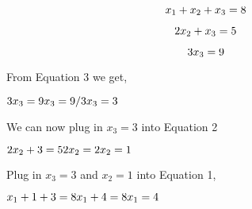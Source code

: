 \documentclass{article}
\begin{document}
    \setcounter{equation}{0} %
    
    \begin{equation} %
        \raggedright x_1 + x_2 + x_3 = 8 
    \end{equation}

    \begin{equation} %
        \raggedright 2x_2 + x_3 = 5 
    \end{equation}

    \begin{equation} %
        \raggedright 3x_3 = 9 
    \end{equation}

\raggedright From Equation 3 we get, \newline

    \begin{math}
         3x_3 = 9 
         \newline %
         x_3 = 9/3 
         \newline
         x_3 = 3
    \end{math} \newline

\raggedright We can now plug in  \begin{math} x_3 = 3 \end{math} into Equation 2 \newline

    \begin{math}
         2x_2 + 3 = 5  
         \newline 
         2x_2 = 2
         \newline
         x_2 = 1
    \end{math} \newline

\raggedright Plug in \begin{math} x_3 = 3 \end{math} and \begin{math} x_2 = 1 \end{math}  into Equation 1, \newline
    
    \begin{math}
        x_1 + 1 + 3 = 8 \newline
        x_1 + 4  = 8 \newline
        x_1 = 4  
    \end{math}
\end{document}
